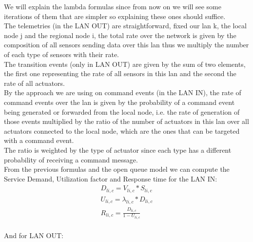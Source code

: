 \documentclass[11pt]{article}
\begin{document}
We will explain the lambda formulas since from now on we will see some iterations of them that are simpler so explaining these ones should suffice.\\
The telemetries (in the LAN OUT) are straightforward, fixed our lan k, the local node j and the regional node i, the total rate over the network is given by the composition of all sensors sending data over this lan thus we multiply the number of each type of sensors with their rate.\\
The transition events (only in LAN OUT) are given by the sum of two elements, the first one representing the rate of all sensors in this lan and the second the rate of all actuators.\\
By the approach we are using on command events (in the LAN IN), the rate of command events over the lan is given by the probability of a command event being generated or forwarded from the local node, i.e. the rate of generation of those events multiplied by the ratio of the number of actuators in this lan over all actuators connected to the local node, which are the ones that can be targeted with a command event.\\
The ratio is weighted by the type of actuator since each type has a different probability of receiving a command message.\\

From the previous formulas and the open queue model we can compute the Service Demand, Utilization factor and Response time for the LAN IN:
\begin{equation}
    \begin{array}{l}
        D_{li, c} = V_{li, c} * S_{li, c} \\
        U_{li, c} = \lambda_{li, c} * D_{li, c} \\
        R_{li, c} = \frac{D_{li, c}}{1 - U_{li, c}} \\
    \end{array}
\end{equation}

And for LAN OUT:
\end{document}
